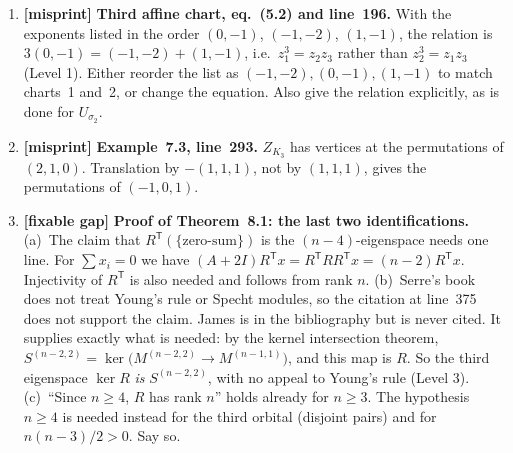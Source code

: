 \documentclass[12pt,letterpaper]{article}
\DeclareMathOperator{\Aut}{Aut}
\newcommand{\CC}{\mathbb C}
\newcommand{\level}[1]{\textsf{Level #1}}
\newcommand{\verdict}[1]{\textbf{[#1]}}
\begin{document}
\begin{enumerate}[label=\textbf{\arabic*.}]
\emph{Fix:} add a short ``affine version'' of Theorem~4.1.  Let $G$ act on $M$ by affine lattice automorphisms whose linear parts lie in $\Aut(\Delta)$ and which preserve a lattice polytope $P$.  For the linearization induced by the monomial embedding, $H^0(X_P,\mathcal L_P)\cong\CC[P\cap M]$ as permutation modules.  Then add one sentence noting that any other linearization twists this by a character of $G$.

\item \verdict{misprint} \textbf{Third affine chart, eq.~(5.2) and line~196.}  With the exponents listed in the order $(0,-1)$, $(-1,-2)$, $(1,-1)$, the relation is $3(0,-1)=(-1,-2)+(1,-1)$, i.e.\ $z_1^3=z_2z_3$ rather than $z_2^3=z_1z_3$ (\level{1}).  Either reorder the list as $(-1,-2),(0,-1),(1,-1)$ to match charts~1 and~2, or change the equation.  Also give the relation explicitly, as is done for $U_{\sigma_2}$.

\item \verdict{misprint} \textbf{Example~7.3, line~293.}  $Z_{K_3}$ has vertices at the permutations of $(2,1,0)$.  Translation by $-(1,1,1)$, not by $(1,1,1)$, gives the permutations of $(-1,0,1)$.

\item \verdict{fixable gap} \textbf{Proof of Theorem~8.1: the last two identifications.}
(a)~The claim that $R^{\mathsf T}(\{\text{zero-sum}\})$ is the $(n-4)$-eigenspace needs one line.  For $\sum x_i=0$ we have $(A+2I)R^{\mathsf T}x=R^{\mathsf T}RR^{\mathsf T}x=(n-2)R^{\mathsf T}x$.  Injectivity of $R^{\mathsf T}$ is also needed and follows from rank $n$.
(b)~Serre's book does not treat Young's rule or Specht modules, so the citation at line~375 does not support the claim.  James \cite{Ja78} is in the bibliography but is never cited.  It supplies exactly what is needed: by the kernel intersection theorem, $S^{(n-2,2)}=\ker\bigl(M^{(n-2,2)}\to M^{(n-1,1)}\bigr)$, and this map is $R$.  So the third eigenspace $\ker R$ \emph{is} $S^{(n-2,2)}$, with no appeal to Young's rule (\level{3}).
(c)~``Since $n\ge4$, $R$ has rank $n$'' holds already for $n\ge3$.  The hypothesis $n\ge4$ is needed instead for the third orbital (disjoint pairs) and for $n(n-3)/2>0$.  Say so.


\end{enumerate}
\end{document}
